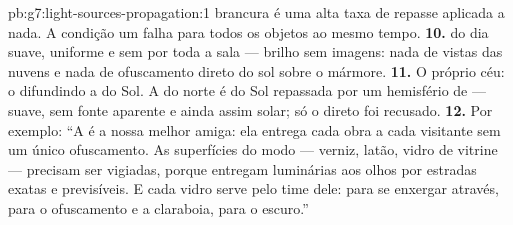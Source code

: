 \begin{solution}{pb:g7:light-sources-propagation:1}
brancura é uma alta taxa de repasse aplicada a nada. A condição um
falha para todos os objetos ao mesmo tempo.
\textbf{10.}  do dia suave, uniforme e sem  por toda a sala
--- brilho sem imagens: nada de vistas das nuvens e nada de
ofuscamento direto do sol sobre o mármore.
\textbf{11.} O próprio céu: o  difundindo a  do Sol. A  do
norte é  do Sol repassada por um hemisfério de  --- suave, sem
fonte aparente e ainda assim solar; só o  direto foi recusado.
\textbf{12.} Por exemplo: ``A  é a nossa melhor amiga: ela
entrega cada obra a cada visitante sem um único ofuscamento. As
superfícies do modo  --- verniz, latão, vidro de vitrine ---
precisam ser vigiadas, porque entregam luminárias aos olhos por
estradas exatas e previsíveis. E cada vidro serve pelo time dele:
 para se enxergar através,  para o
ofuscamento e a claraboia,  para o escuro.''
\end{solution}
